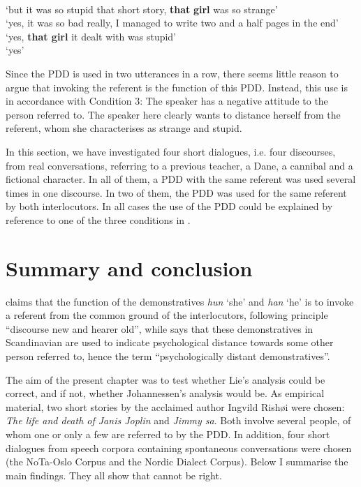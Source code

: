 \documentclass[output=paper,colorlinks,citecolor=brown]{langscibook}
\begin{document}
\ea\label{ex:johannessen:33}
 \\
\glt ‘but it was so stupid that short story, \textbf{that} \textbf{girl} was so strange’
 \\
\glt ‘yes, it was so bad really, I managed to write two and a half pages in the end’
 \\
\glt ‘yes, \textbf{that girl} it dealt with was stupid’
\\
\glt ‘yes’
\z
\z

Since the PDD is used in two utterances in a row, there seems little reason to argue that invoking the referent is the function of this PDD. Instead, this use is in accordance with Condition 3: The speaker has a negative attitude to the person referred to. The speaker here clearly wants to distance herself from the referent, whom she characterises as strange and stupid. 

In this section, we have investigated four short dialogues, i.e. four discourses, from real conversations, referring to a previous teacher, a Dane, a cannibal and a fictional character. In all of them, a PDD with the same referent was used several times in one discourse. In two of them, the PDD was used for the same referent by both interlocutors. In all cases the use of the PDD could be explained by reference to one of the three conditions in \citet{Johannessen2008}.

\section{Summary and conclusion}\label{sec:johannessen:6}

\citet{Lie2010} claims that the function of the demonstratives \textit{hun} ‘she’ and \textit{han} ‘he’ is to invoke a referent from the common ground of the interlocutors, following  principle “discourse new and hearer old”, while \citet{Johannessen2008} says that these demonstratives in Scandinavian are used to indicate psychological distance towards some other person referred to, hence the term “psychologically distant demonstratives”. 

The aim of the present chapter was to test whether Lie’s analysis could be correct, and if not, whether Johannessen’s analysis would be. As empirical material, two short stories by the acclaimed author Ingvild Rishøi were chosen: \textit{The life and death of Janis Joplin} and \textit{Jimmy sa}. Both involve several people, of whom one or only a few are referred to by the PDD. In addition, four short dialogues from speech corpora containing spontaneous conversations were chosen (the NoTa-Oslo Corpus and the Nordic Dialect Corpus). Below I summarise the main findings. They all show that \citet{Lie2010} cannot be right.
\end{document}
